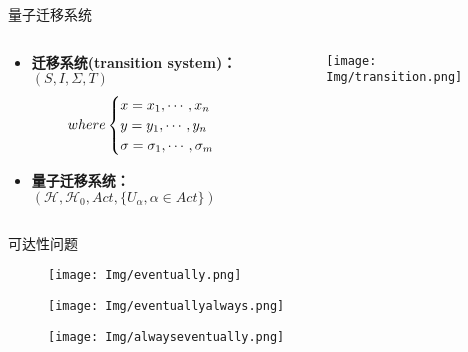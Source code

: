 \documentclass[aspectratio=1610]{ctexbeamer}
\begin{document}
\begin{frame}{量子迁移系统}
    \begin{columns}[T] %

        \begin{column}{.6\textwidth}
            \begin{itemize}
                \item  \textbf{迁移系统(transition system)：} $(S, I, \Sigma, T)$
                \begin{equation}
                  where
                  \begin{cases}
                    x = x_1, \cdots, x_n\\
                    y = y_1, \cdots, y_n\\
                    \sigma = \sigma_1, \cdots, \sigma_m
                  \end{cases}
                  \notag
                \end{equation}
                \item \textbf{量子迁移系统：} $(\mathcal{H}, \mathcal{H}_0, Act, \{U_\alpha,\alpha\in Act\})$
            \end{itemize}
        \end{column}
    
        \begin{column}{.3\textwidth}
          \begin{figure}
            \centering
            \texttt{[image: Img/transition.png]}
          \end{figure}
        \end{column}
    
      \end{columns}
\end{frame}
\begin{frame}{可达性问题}
    \begin{figure}
        \texttt{[image: Img/eventually.png]}
    \end{figure}
    \begin{figure}
        \texttt{[image: Img/eventuallyalways.png]}
    \end{figure}
    \begin{figure}
        \texttt{[image: Img/alwayseventually.png]}
    \end{figure}
  \end{frame}
\end{document}
